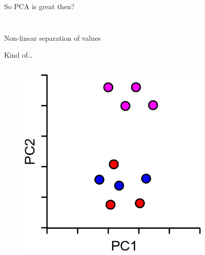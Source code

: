 \begin{frame}[allowframebreaks]{So PCA is great then?}
\begin{columns}
\begin{column}{0.5\textwidth}
\begin{figure}
        \end{figure}
    \end{column}
    \end{columns}
    \begin{center}
        Non-linear separation of values
    \end{center}

    \framebreak

    Kind of\dots
    \begin{columns}
    \begin{column}{0.5\textwidth}
        \begin{figure}
            \centering
            \includegraphics[width=1\textwidth,keepaspectratio]{images/dul/dim-reduce/pca-nonlinear-optimised-1.png}
        \end{figure}
    \end{column}
    \begin{column}{0.5\textwidth}
        \begin{figure}
            \centering

\end{figure}
\end{column}
\end{columns}
\end{frame}
